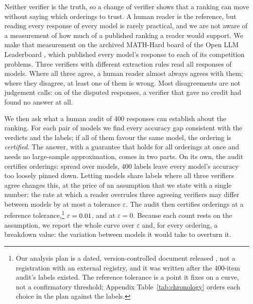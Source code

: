 Neither verifier is the truth, so a change of verifier shows that a ranking can move without saying
which orderings to trust. A human reader is the reference, but reading every response of every model is
rarely practical, and we are not aware of a measurement of how much of a published ranking a reader would support. We make
that measurement on the archived MATH-Hard board of the Open LLM Leaderboard
\citep{openllmleaderboard, fourrier2024openllm}, which published every model's response to each of
its \NumItems{} competition problems. Three verifiers with different extraction rules read all
\NumRows{} responses of \NumModels{} models. Where all three agree, a human reader almost always
agrees with them; where they disagree, at least one of them is wrong. Most disagreements are not
judgement calls: on \TaxExtraction{} of the \RowsAnyDisagree{} disputed responses, a verifier that gave
no credit had found no answer at all.

We then ask what a human audit of 400 responses can establish about the ranking. For each pair of
models we find every accuracy gap consistent with the verdicts and the labels; if all of them favour
the same model, the ordering is \emph{certified}. The answer, with a guarantee that holds for all
\NumOrderings{} orderings at once and needs no large-sample approximation, comes in two parts. On its
own, the audit certifies \CertFixedNoPooling{} orderings: spread over \NumModels{} models, 400 labels
leave every model's accuracy too loosely pinned down. Letting models share labels where all three
verifiers agree changes this, at the price of an assumption that we state with a single number: the
rate at which a reader overrules three agreeing verifiers may differ between models by at most a
tolerance $\varepsilon$. The audit then certifies \CertFixedPrereg{} orderings at a reference tolerance,\footnote{Our analysis plan is a dated, version-controlled document
released \SuppWhere, not a registration with an external registry, and it was written after
the 400-item audit's labels existed. The reference tolerance is a point it fixes on a curve, not a
confirmatory threshold; Appendix Table~\ref{tab:chronology} orders each choice in the plan against
the labels.} $\varepsilon = 0.01$, and \CertFixedEpsZero{} at $\varepsilon = 0$. Because each count rests on the assumption,
we report the whole curve over $\varepsilon$ and, for every ordering, a breakdown value: the variation
between models it would take to overturn it.

